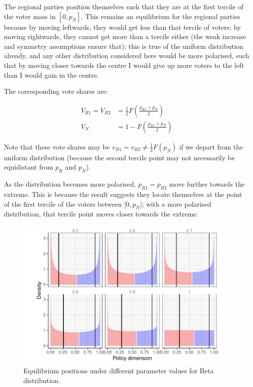 \documentclass[11pt]{article}
\begin{document}
The regional parties position themselves such that they are at the first tercile of the voter mass in $[0, p_N]$. This remains an equilibrium for the regional parties because by moving leftwards, they would get less than that tercile of voters; by moving rightwards, they cannot get more than a tercile either (the weak increase and symmetry assumptions ensure that); this is true of the uniform distribution already, and any other distribution considered here would be more polarised, such that by moving closer towards the centre I would give up more voters to the left than I would gain in the centre.

The corresponding vote shares are:

\begin{align*}
    V_{R1} = V_{R2} & = \frac{1}{2} F(\frac{p_{R1} + p_N}{2}) \\
    V_N & = 1 - F(\frac{p_{R1} + p_N}{2})
\end{align*}

Note that these vote shares may be $v_{R1} = v_{R2} \neq \frac{1}{3} F(p_N)$ if we depart from the uniform distribution (because the second tercile point may not necessarily be equidistant from $p_R$ and $p_N$).

As the distribution becomes more polarised, $p_{R1} = p_{R2}$ move further towards the extreme. This is because the result suggests they locate themselves at the point of the first tercile of the voters between $[0, p_N$]; with a more polarised distribution, that tercile point moves closer towards the extreme.

\begin{figure}
    \centering
    \includegraphics{../../output/polarisation.pdf}
    \caption{Equilibrium positions under different parameter values for Beta distribution.}
    \label{fig:betadist}
\end{figure}
\end{document}
